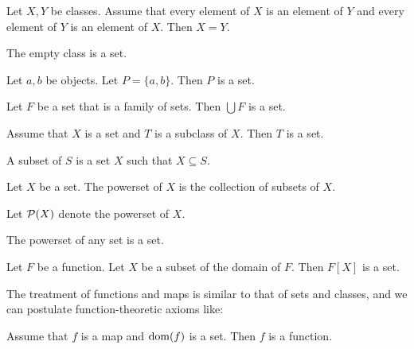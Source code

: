\documentclass{article}
\newcommand{\pow}{{\cal P}}
\begin{document}
\begin{forthel}
\begin{lemma}
    Let $X, Y$ be classes.
    Assume that every element of $X$ is an element of $Y$ and every element of
    $Y$ is an element of $X$.
    Then $X = Y$.
\end{lemma}

\begin{axiom}
The empty class is a set.
\end{axiom}

\begin{axiom}
Let $a,b$ be objects. Let $P = \{a,b\}$. Then $P$  is a set.
\end{axiom}

\begin{axiom}
Let $F$ be a set that is a family of sets. Then
$\bigcup F$ is a set.
\end{axiom}

\begin{axiom}
    Assume that $X$ is a set and $T$ is a subclass of $X$.
    Then $T$ is a set.
\end{axiom}

\begin{definition}
A subset of $S$ is a set $X$ such that $X \subseteq S$.
\end{definition}

\begin{definition}
      Let $X$ be a set.
      The powerset of $X$ is the collection of subsets of $X$.
\end{definition}

Let $\pow(X)$ denote the powerset of $X$.

\begin{axiom}
  The powerset of any set is a set.
\end{axiom}

\begin{axiom}
Let $F$ be a function.
Let $X$ be a subset of the domain of $F$.
Then $F[X]$ is a set.
\end{axiom}
\end{forthel}

The treatment of functions and maps is similar to that
of sets and classes, and we can postulate function-theoretic
axioms like:

\begin{forthel}
  \begin{axiom}
    Assume that $f$ is a map and $\operatorname{dom}(f)$ is a set.
    Then $f$ is a function.
  \end{axiom}
\end{forthel}
\end{document}
